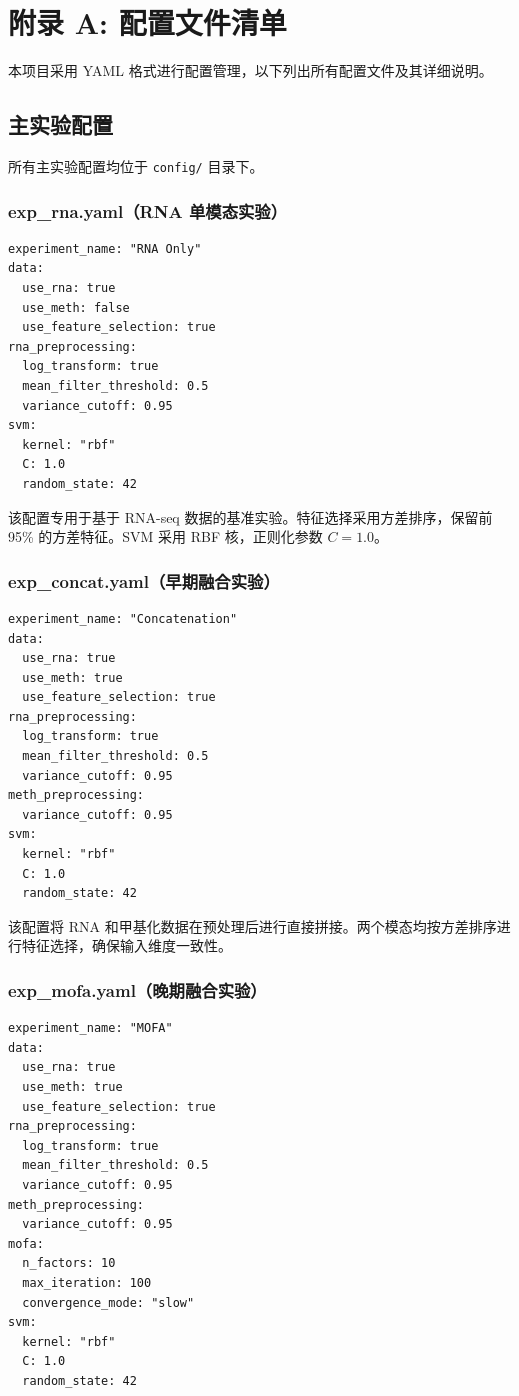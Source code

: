 \section*{附录 A: 配置文件清单}

本项目采用 YAML 格式进行配置管理，以下列出所有配置文件及其详细说明。

\subsection*{主实验配置}

所有主实验配置均位于 \texttt{config/} 目录下。

\subsubsection*{exp\_rna.yaml（RNA 单模态实验）}

\begin{verbatim}
experiment_name: "RNA Only"
data:
  use_rna: true
  use_meth: false
  use_feature_selection: true
rna_preprocessing:
  log_transform: true
  mean_filter_threshold: 0.5
  variance_cutoff: 0.95
svm:
  kernel: "rbf"
  C: 1.0
  random_state: 42
\end{verbatim}

该配置专用于基于 RNA-seq 数据的基准实验。特征选择采用方差排序，保留前 95\% 的方差特征。SVM 采用 RBF 核，正则化参数 $C=1.0$。

\subsubsection*{exp\_concat.yaml（早期融合实验）}

\begin{verbatim}
experiment_name: "Concatenation"
data:
  use_rna: true
  use_meth: true
  use_feature_selection: true
rna_preprocessing:
  log_transform: true
  mean_filter_threshold: 0.5
  variance_cutoff: 0.95
meth_preprocessing:
  variance_cutoff: 0.95
svm:
  kernel: "rbf"
  C: 1.0
  random_state: 42
\end{verbatim}

该配置将 RNA 和甲基化数据在预处理后进行直接拼接。两个模态均按方差排序进行特征选择，确保输入维度一致性。

\subsubsection*{exp\_mofa.yaml（晚期融合实验）}

\begin{verbatim}
experiment_name: "MOFA"
data:
  use_rna: true
  use_meth: true
  use_feature_selection: true
rna_preprocessing:
  log_transform: true
  mean_filter_threshold: 0.5
  variance_cutoff: 0.95
meth_preprocessing:
  variance_cutoff: 0.95
mofa:
  n_factors: 10
  max_iteration: 100
  convergence_mode: "slow"
svm:
  kernel: "rbf"
  C: 1.0
  random_state: 42
\end{verbatim}

